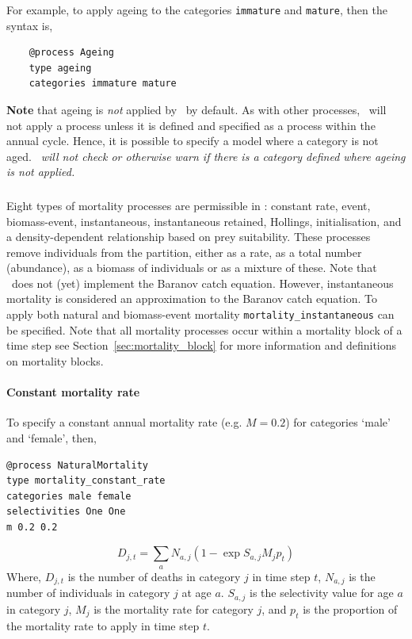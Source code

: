 For example, to apply ageing to the categories \texttt{immature} and \texttt{mature}, then the syntax is,

{\small{\begin{verbatim}
	@process Ageing
	type ageing
	categories immature mature
	\end{verbatim}}}

\textbf{Note} that ageing is \emph{not} applied by \CNAME\ by default. As with other processes, \CNAME\ will not apply a process unless it is defined and specified as a process within the annual cycle. Hence, it is possible to specify a model where a category is not aged. \emph{\CNAME\ will not check or otherwise warn if there is a category defined where ageing is not applied.}

\subsubsection{\label{sec:mortality}}

Eight types of mortality processes are permissible in \CNAME: constant rate, event, biomass-event, instantaneous, instantaneous retained, Hollings, initialisation, and a density-dependent relationship based on prey suitability. These processes remove individuals from the partition, either as a rate, as a total number (abundance), as a biomass of individuals or as a mixture of these. Note that \CNAME\ does not (yet) implement the Baranov catch equation. However, instantaneous mortality is considered an approximation to the Baranov catch equation. To apply both natural and biomass-event mortality \texttt{mortality\_instantaneous} can be specified. Note that all mortality processes occur within a mortality block of a time step see Section~\ref{sec:mortality_block} for more information and definitions on mortality blocks.

\paragraph{Constant mortality rate}
To specify a constant annual mortality rate (e.g. $M=0.2$) for categories `male' and `female', then,
{\small{\begin{verbatim}
@process NaturalMortality
type mortality_constant_rate
categories male female
selectivities One One
m 0.2 0.2

\end{verbatim}}}

\begin{equation}
D_{j,t} = \sum_a N_{a,j} (1 - \exp{S_{a,j} M_j p_t})
\end{equation}
Where, $D_{j,t}$ is the number of deaths in category $j$ in time step $t$, $N_{a,j}$ is the number of individuals in category $j$ at age $a$. $S_{a,j}$ is the selectivity value for age $a$ in category $j$, $M_j$ is the mortality rate for category $j$, and $p_t$ is the proportion of the mortality rate to apply in time step $t$.

